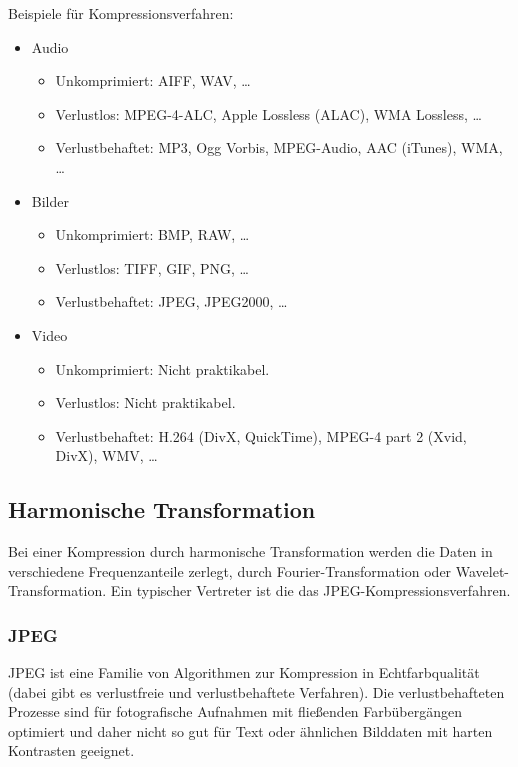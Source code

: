 		Beispiele für Kompressionsverfahren:
		\begin{itemize}
			\item Audio
				\begin{itemize}
					\item Unkomprimiert: AIFF, WAV, \dots
					\item Verlustlos: MPEG-4-ALC, Apple Lossless (ALAC), WMA Lossless, \dots
					\item Verlustbehaftet: MP3, Ogg Vorbis, MPEG-Audio, AAC (iTunes), WMA, \dots
				\end{itemize}
			\item Bilder
				\begin{itemize}
					\item Unkomprimiert: BMP, RAW, \dots
					\item Verlustlos: TIFF, GIF, PNG, \dots
					\item Verlustbehaftet: JPEG, JPEG2000, \dots
				\end{itemize}
			\item Video
				\begin{itemize}
					\item Unkomprimiert: Nicht praktikabel.
					\item Verlustlos: Nicht praktikabel.
					\item Verlustbehaftet: H.264 (DivX, QuickTime), MPEG-4 part 2 (Xvid, DivX), WMV, \dots
				\end{itemize}
		\end{itemize}

		\subsection{Harmonische Transformation}
			Bei einer Kompression durch harmonische Transformation werden die Daten in verschiedene Frequenzanteile zerlegt, \zB durch Fourier-Transformation oder Wavelet-Transformation. Ein typischer Vertreter ist die das JPEG-Kompressionsverfahren.

			\subsubsection{JPEG}
				JPEG ist eine Familie von Algorithmen zur Kompression in Echtfarbqualität (dabei gibt es verlustfreie und verlustbehaftete Verfahren). Die verlustbehafteten Prozesse sind für fotografische Aufnahmen mit fließenden Farbübergängen optimiert und daher nicht so gut für Text oder ähnlichen Bilddaten mit harten Kontrasten geeignet.
				
